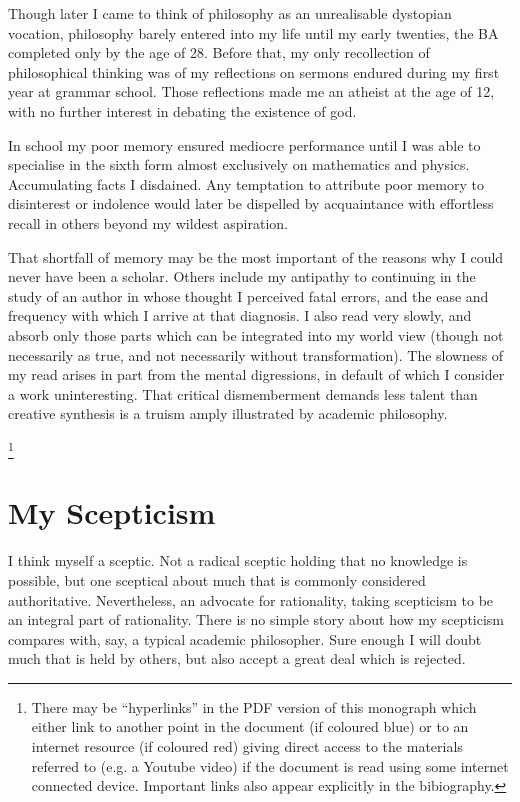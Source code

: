 \documentclass[10pt,titlepage]{book}
\begin{document}
Though later I came to think of philosophy as an unrealisable dystopian vocation, philosophy barely entered into my life until my early twenties, the BA completed only by the age of 28.
Before that, my only recollection of philosophical thinking was of my reflections on sermons endured during my first year at grammar school.
Those reflections made me an atheist at the age of 12, with no further interest in debating the existence of god.

In school my poor memory ensured mediocre performance until I was able to specialise in the sixth form almost exclusively on mathematics and physics.
Accumulating facts I disdained.
Any temptation to attribute poor memory to disinterest or indolence would later be dispelled by acquaintance with effortless recall in others beyond my wildest aspiration.

That shortfall of memory may be the most important of the reasons why I could never have been a scholar.
Others include my antipathy to continuing in the study of an author in whose thought I perceived fatal errors, and the ease and frequency with which I arrive at that diagnosis.
I also read very slowly, and absorb only those parts which can be integrated into my world view (though not necessarily as true, and not necessarily without transformation).
The slowness of my read arises in part from the mental digressions, in default of which I consider a work uninteresting.
That critical dismemberment demands less talent than creative synthesis is a truism amply illustrated by academic philosophy.

\footnote{There may be ``hyperlinks'' in the PDF version of this monograph which either link to another point in the document  (if coloured blue) or to an internet resource  (if coloured red) giving direct access to the materials referred to (e.g. a Youtube video) if the document is read using some internet connected device.
  Important links also appear explicitly in the bibiography.}


\section{My Scepticism}

I think myself a sceptic.
Not a radical sceptic holding that no knowledge is possible, but one sceptical about much that is commonly considered authoritative.
Nevertheless, an advocate for rationality, taking scepticism to be an integral part of rationality.
There is no simple story about how my scepticism compares with, say, a typical academic philosopher.
Sure enough I will doubt much that is held by others, but also accept a great deal which is rejected.
\end{document}
